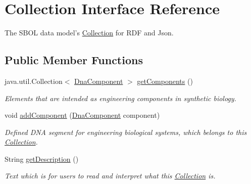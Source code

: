 \hypertarget{interfaceorg_1_1sbolstandard_1_1core_1_1_collection}{
\section{Collection Interface Reference}
\label{interfaceorg_1_1sbolstandard_1_1core_1_1_collection}
}


The SBOL data model's \hyperlink{interfaceorg_1_1sbolstandard_1_1core_1_1_collection}{Collection} for RDF and Json.  


\subsection*{Public Member Functions}
\begin{DoxyCompactItemize}
\item 
java.util.Collection$<$ \hyperlink{interfaceorg_1_1sbolstandard_1_1core_1_1_dna_component}{DnaComponent} $>$ \hyperlink{interfaceorg_1_1sbolstandard_1_1core_1_1_collection_a4b2f1b2c12078e7937d26142f97f172d}{getComponents} ()
\begin{DoxyCompactList}\small\item\em Elements that are intended as engineering components in synthetic biology. \item\end{DoxyCompactList}\item 
void \hyperlink{interfaceorg_1_1sbolstandard_1_1core_1_1_collection_a9ff983431034c861c97db6aeeecfa9c9}{addComponent} (\hyperlink{interfaceorg_1_1sbolstandard_1_1core_1_1_dna_component}{DnaComponent} component)
\begin{DoxyCompactList}\small\item\em Defined DNA segment for engineering biological systems, which belongs to this \hyperlink{interfaceorg_1_1sbolstandard_1_1core_1_1_collection}{Collection}. \item\end{DoxyCompactList}\item 
String \hyperlink{interfaceorg_1_1sbolstandard_1_1core_1_1_collection_ac7feffb7a33f63504ff1f87f19e2d2d8}{getDescription} ()
\begin{DoxyCompactList}\small\item\em Text which is for users to read and interpret what this \hyperlink{interfaceorg_1_1sbolstandard_1_1core_1_1_collection}{Collection} is. \item\end{DoxyCompactList}\item 

\end{DoxyCompactItemize}
